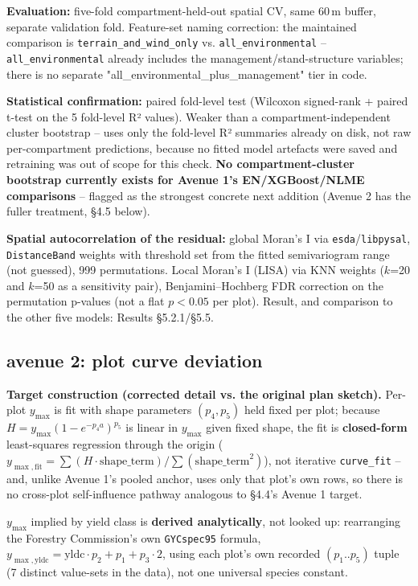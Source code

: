\documentclass[11pt,a4paper]{report}
\begin{document}
\textbf{Evaluation:} five-fold compartment-held-out spatial CV, same 60\,m buffer, separate
validation fold. Feature-set naming correction: the maintained comparison is
\texttt{terrain\_and\_wind\_only} vs. \texttt{all\_environmental} -- \texttt{all\_environmental}
already includes the management/stand-structure variables; there is no separate
"all\_environmental\_plus\_management" tier in code.

\textbf{Statistical confirmation:} paired fold-level test (Wilcoxon signed-rank + paired t-test on
the 5 fold-level R² values). Weaker than a compartment-independent cluster bootstrap -- uses only
the fold-level R² summaries already on disk, not raw per-compartment predictions, because no
fitted model artefacts were saved and retraining was out of scope for this check. \textbf{No
compartment-cluster bootstrap currently exists for Avenue 1's EN/XGBoost/NLME comparisons} --
flagged as the strongest concrete next addition (Avenue 2 has the fuller treatment, \S4.5 below).

\textbf{Spatial autocorrelation of the residual:} global Moran's I via \texttt{esda}/\texttt{libpysal},
\texttt{DistanceBand} weights with threshold set from the fitted semivariogram range (not guessed),
999 permutations. Local Moran's I (LISA) via KNN weights ($k$=20 and $k$=50 as a sensitivity pair),
Benjamini--Hochberg FDR correction on the permutation p-values (not a flat $p<0.05$ per plot).
Result, and comparison to the other five models: Results \S5.2.1/\S5.5.

\subsection{avenue 2: plot curve deviation}

\textbf{Target construction (corrected detail vs. the original plan sketch).} Per-plot $y_{\max}$
is fit with shape parameters $(p_4, p_5)$ held fixed per plot; because
$H = y_{\max}(1-e^{-p_4 a})^{p_5}$ is linear in $y_{\max}$ given fixed shape, the fit is
\textbf{closed-form} least-squares regression through the origin
($y_{\max,\text{fit}} = \sum(H\cdot\text{shape\_term}) / \sum(\text{shape\_term}^2)$), not
iterative \texttt{curve\_fit} -- and, unlike Avenue 1's pooled anchor, uses only that plot's own
rows, so there is no cross-plot self-influence pathway analogous to \S4.4's Avenue 1 target.

$y_{\max}$ implied by yield class is \textbf{derived analytically}, not looked up: rearranging the
Forestry Commission's own \texttt{GYCspec95} formula,
$y_{\max,\text{yldc}} = \text{yldc}\cdot p_2 + p_1 + p_3\cdot 2$, using each plot's own recorded
$(p_1..p_5)$ tuple (7 distinct value-sets in the data), not one universal species constant.
\end{document}
